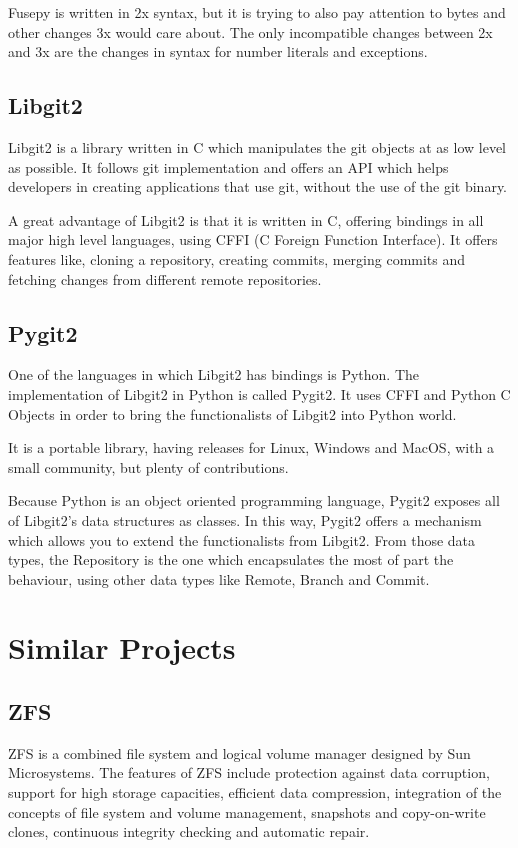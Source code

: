         Fusepy is written in 2x syntax, but it is trying to also pay attention to bytes and other changes 3x would care about. The only incompatible changes between 2x and 3x are the changes in syntax for number literals and exceptions.
    \subsection{Libgit2}
        Libgit2 is a library written in C which manipulates the git objects at as low level as possible. It follows git implementation and offers an API which helps developers in creating applications that use git, without the use of the git binary.

        A great advantage of Libgit2 is that it is written in C, offering bindings in all major high level languages, using CFFI (C Foreign Function Interface). It offers features like, cloning a repository, creating commits, merging commits and fetching changes from different remote repositories.

    \subsection{Pygit2}
        One of the languages in which Libgit2 has bindings is Python. The implementation of Libgit2 in Python is called Pygit2. It uses CFFI and Python C Objects in order to bring the functionalists of Libgit2 into Python world.

        It is a portable library, having releases for Linux, Windows and MacOS, with a small community, but plenty of contributions.

        Because Python is an object oriented programming language, Pygit2 exposes all of Libgit2's data structures as classes. In this way, Pygit2 offers a mechanism which allows you to extend the functionalists from Libgit2. From those data types, the Repository is the one which encapsulates the most of part the behaviour, using other data types like Remote, Branch and Commit.

\section{Similar Projects}
    \subsection{ZFS}
        ZFS is a combined file system and logical volume manager designed by Sun Microsystems. The features of ZFS include protection against data corruption, support for high storage capacities, efficient data compression, integration of the concepts of file system and volume management, snapshots and copy-on-write clones, continuous integrity checking and automatic repair.

